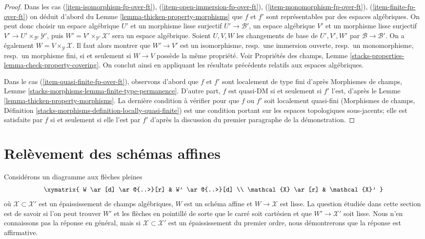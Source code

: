 \begin{proof}
\medskip\noindent
Dans les cas (\ref{item-isomorphism-fp-over-ft}),
(\ref{item-open-immersion-fp-over-ft}),
(\ref{item-monomorphism-fp-over-ft}),
(\ref{item-finite-fp-over-ft})
on déduit d'abord du Lemme \ref{lemma-thicken-property-morphisms}
que $f$ et $f'$ sont représentables par des espaces algébriques. On peut donc choisir
un espace algébrique $U'$ et un morphisme lisse surjectif
$U' \to \mathcal{B}'$,
un espace algébrique $V'$ et un morphisme lisse surjectif
$V' \to U' \times_{\mathcal{B}'} \mathcal{Y}'$, puis
$W' = V' \times_{\mathcal{Y}'} \mathcal{X}'$ sera un espace algébrique.
Soient $U, V, W$ les changements de base de
$U', V', W'$ par $\mathcal{B} \to \mathcal{B}'$.
On a également $W = V \times_\mathcal{Y} \mathcal{X}$.
Il faut alors montrer que $W' \to V'$ est un
isomorphisme, resp.\ une immersion ouverte, resp.\ un monomorphisme,
resp.\ un morphisme fini, si et seulement si $W \to V$ possède la même propriété.
Voir Propriétés des champs, Lemme
\ref{stacks-properties-lemma-check-property-covering}.
On conclut ainsi en appliquant les résultats
précédents relatifs aux espaces algébriques.

\medskip\noindent
Dans le cas (\ref{item-quasi-finite-fp-over-ft}), observons d'abord
que $f$ et $f'$ sont localement de type fini d'après
Morphismes de champs, Lemme \ref{stacks-morphisms-lemma-finite-type-permanence}.
D'autre part, $f$ est quasi-DM si et seulement si
$f'$ l'est, d'après le
Lemme \ref{lemma-thicken-property-morphisms}.
La dernière condition à vérifier pour que $f$ ou $f'$ soit localement quasi-fini
(Morphismes de champs, Définition
\ref{stacks-morphisms-definition-locally-quasi-finite})
est une condition portant sur les espaces topologiques sous-jacents;
elle est satisfaite par $f$ si et seulement si elle l'est par $f'$ d'après
la discussion du premier paragraphe de la démonstration.
\end{proof}









\section{Relèvement des schémas affines}
\label{section-lifting-affines}

\noindent
Considérons un diagramme aux flèches pleines
$$
\xymatrix{
W \ar[d] \ar@{..>}[r] & W' \ar@{..>}[d] \\
\mathcal{X} \ar[r] & \mathcal{X}'
}
$$
où $\mathcal{X} \subset \mathcal{X}'$ est un épaississement de champs algébriques,
$W$ est un schéma affine et $W \to \mathcal{X}$ est lisse. La question
étudiée dans cette section est de savoir si l'on peut trouver $W'$ et les flèches
en pointillé de sorte que le carré soit cartésien et que $W' \to \mathcal{X}'$ soit lisse.
Nous n'en connaissons pas la réponse en général, mais si $\mathcal{X} \subset \mathcal{X}'$
est un épaississement du premier ordre, nous démontrerons que la réponse est affirmative.

